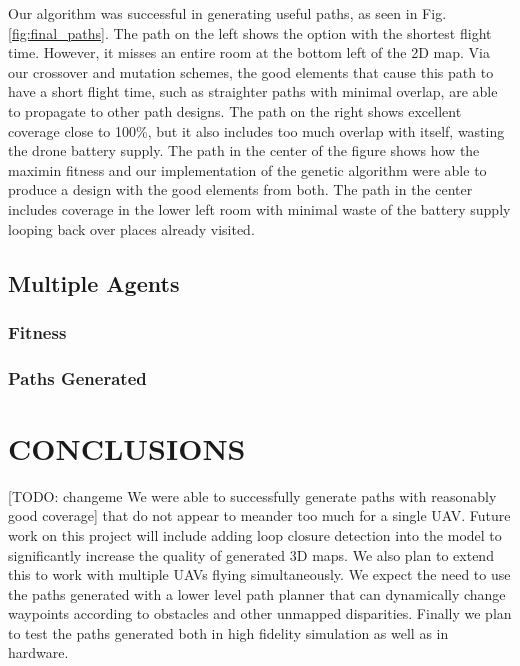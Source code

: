 \documentclass[letterpaper, 10 pt, conference]{ieeeconf}  %
\newcommand{\todo}[1]{{\color{blue}[TODO: #1]}}
\begin{document}
Our algorithm was successful in generating useful paths, as seen in Fig. \ref{fig:final_paths}. The path on the left shows the option with the shortest flight time. However, it misses an entire room at the bottom left of the 2D map. Via our crossover and mutation schemes, the good elements that cause this path to have a short flight time, such as straighter paths with minimal overlap, are able to propagate to other path designs. The path on the right shows excellent coverage close to 100\%, but it also includes too much overlap with itself, wasting the drone battery supply. The path in the center of the figure shows how the maximin fitness and our implementation of the genetic algorithm were able to produce a design with the good elements from both. The path in the center includes coverage in the lower left room with minimal waste of the battery supply looping back over places already visited.


\subsection{Multiple Agents}
\subsubsection{Fitness}
\subsubsection{Paths Generated}
\section{CONCLUSIONS}\label{conclusions}

\todo{changeme We were able to successfully generate paths with reasonably good coverage} that do not appear to meander too much for a single UAV. Future work on this project will include adding loop closure detection into the model to significantly increase the quality of generated 3D maps. We also plan to extend this to work with multiple UAVs flying simultaneously. We expect the need to use the paths generated with a lower level path planner that can dynamically change waypoints according to obstacles and other unmapped disparities. Finally we plan to test the paths generated both in high fidelity simulation as well as in hardware.



\end{document}

